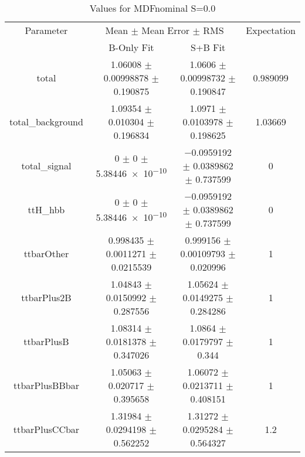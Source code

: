 \begin{table}
\centering
\caption{Values for MDFnominal S=0.0}
\begin{tabular}{cccc}
\toprule
Parameter & \multicolumn{2}{c}{Mean $\pm$ Mean Error $\pm$ RMS} & Expectation\\
 & B-Only Fit & S+B Fit & \\
\midrule
total & \num{1.06008} $\pm$ \num{0.00998878} $\pm$ \num{0.190875} & \num{1.0606} $\pm$ \num{0.00998732} $\pm$ \num{0.190847} & \num{0.989099}\\
total\_background & \num{1.09354} $\pm$ \num{0.010304} $\pm$ \num{0.196834} & \num{1.0971} $\pm$ \num{0.0103978} $\pm$ \num{0.198625} & \num{1.03669}\\
total\_signal & \num{0} $\pm$ \num{0} $\pm$ \num{5.38446e-10} & \num{-0.0959192} $\pm$ \num{0.0389862} $\pm$ \num{0.737599} & \num{0}\\
ttH\_hbb & \num{0} $\pm$ \num{0} $\pm$ \num{5.38446e-10} & \num{-0.0959192} $\pm$ \num{0.0389862} $\pm$ \num{0.737599} & \num{0}\\
ttbarOther & \num{0.998435} $\pm$ \num{0.0011271} $\pm$ \num{0.0215539} & \num{0.999156} $\pm$ \num{0.00109793} $\pm$ \num{0.020996} & \num{1}\\
ttbarPlus2B & \num{1.04843} $\pm$ \num{0.0150992} $\pm$ \num{0.287556} & \num{1.05624} $\pm$ \num{0.0149275} $\pm$ \num{0.284286} & \num{1}\\
ttbarPlusB & \num{1.08314} $\pm$ \num{0.0181378} $\pm$ \num{0.347026} & \num{1.0864} $\pm$ \num{0.0179797} $\pm$ \num{0.344} & \num{1}\\
ttbarPlusBBbar & \num{1.05063} $\pm$ \num{0.020717} $\pm$ \num{0.395658} & \num{1.06072} $\pm$ \num{0.0213711} $\pm$ \num{0.408151} & \num{1}\\
ttbarPlusCCbar & \num{1.31984} $\pm$ \num{0.0294198} $\pm$ \num{0.562252} & \num{1.31272} $\pm$ \num{0.0295284} $\pm$ \num{0.564327} & \num{1.2}\\
\bottomrule
\end{tabular}
\end{table}